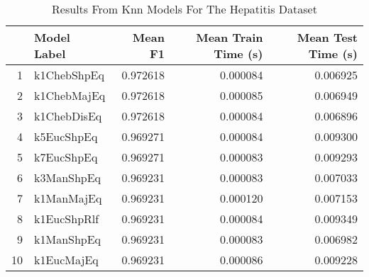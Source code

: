 \begin{table}[!htbp]
\centering
\caption{Results From Knn Models For The Hepatitis Dataset}
\label{tab:knn_results_hepatitis}
\begin{tabular}{rlrrr}
\toprule
 & Model Label & Mean F1 & Mean Train Time (s) & Mean Test Time (s) \\
\midrule
1 & k1ChebShpEq & 0.972618 & 0.000084 & 0.006925 \\
2 & k1ChebMajEq & 0.972618 & 0.000085 & 0.006949 \\
3 & k1ChebDisEq & 0.972618 & 0.000084 & 0.006896 \\
4 & k5EucShpEq & 0.969271 & 0.000084 & 0.009300 \\
5 & k7EucShpEq & 0.969271 & 0.000083 & 0.009293 \\
6 & k3ManShpEq & 0.969231 & 0.000083 & 0.007033 \\
7 & k1ManMajEq & 0.969231 & 0.000120 & 0.007153 \\
8 & k1EucShpRlf & 0.969231 & 0.000084 & 0.009349 \\
9 & k1ManShpEq & 0.969231 & 0.000083 & 0.006982 \\
10 & k1EucMajEq & 0.969231 & 0.000086 & 0.009228 \\
\bottomrule
\end{tabular}
\end{table}
